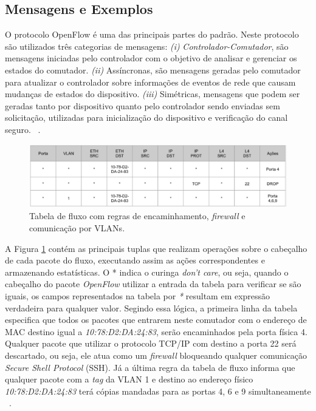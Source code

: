 \subsection{Mensagens e Exemplos}
\label{sub:protocolo}
O protocolo OpenFlow é uma das principais partes do padrão. Neste protocolo são utilizados três categorias de mensagens: 
\textit{(i)} \textit{Controlador-Comutador}, são mensagens iniciadas pelo controlador com o objetivo de analisar e gerenciar os estados do comutador. 
\textit{(ii)} Assíncronas, são mensagens geradas pelo comutador para atualizar o controlador sobre informações de eventos de rede que causam mudanças de estados do dispositivo. 
\textit{(iii)} Simétricas, mensagens que podem ser geradas tanto por dispositivo quanto pelo controlador sendo enviadas sem solicitação, utilizadas para inicialização do dispositivo e verificação do canal seguro.  ~\cite{pfaff2012openflow}.


\begin{figure}[!htb]
	\caption{\label{fig:exemplo_tabela} Tabela de fluxo com regras de encaminhamento, \textit{firewall} e comunicação por VLANs.}
	\begin{center}
	    \includegraphics[scale=0.20]{imagens/tabela.png}
	\end{center}
\end{figure}

A Figura \ref{fig:exemplo_tabela} contém as principais tuplas que realizam operações sobre o cabeçalho de cada pacote do fluxo, executando assim as ações correspondentes e armazenando estatísticas. O * indica o curinga \textit{don't care}, ou seja, quando o cabeçalho do pacote \textit{OpenFlow} utilizar a entrada da tabela para verificar se são iguais, os campos representados na tabela por \textit{*} resultam em expressão verdadeira para qualquer valor. Segindo essa lógica, a primeira linha da tabela especifica que todos os pacotes que entrarem neste comutador com o endereço de MAC destino igual a \textit{10:78:D2:DA:24:83}, serão encaminhados pela porta física 4. Qualquer pacote que utilizar o protocolo TCP/IP com destino a porta 22 será descartado, ou seja, ele atua como um \textit{firewall} bloqueando qualquer comunicação \emph{Secure Shell Protocol} (SSH). Já a última regra da tabela de fluxo informa que qualquer pacote com a \textit{tag} da VLAN 1 e destino ao endereço físico \textit{10:78:D2:DA:24:83}  terá cópias mandadas para as portas 4, 6 e 9 simultaneamente ~\cite{guedes:2}.

